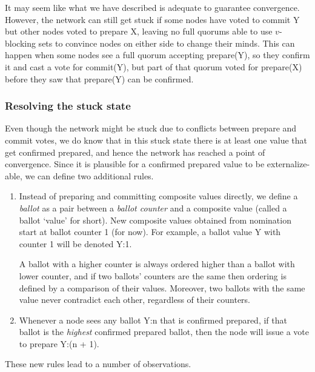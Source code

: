It may seem like what we have described is adequate to guarantee convergence. However, the network can still get stuck if some nodes have voted to commit Y but other nodes voted to prepare X, leaving no full quorums able to use $v$-blocking sets to convince nodes on either side to change their minds. This can happen when some nodes see a full quorum accepting prepare(Y), so they confirm it and cast a vote for commit(Y), but part of that quorum voted for prepare(X) before they saw that prepare(Y) can be confirmed.

\subsubsection{Resolving the stuck state}

Even though the network might be stuck due to conflicts between prepare and commit votes, we do know that in this stuck state there is at least one value that get confirmed prepared, and hence the network has reached a point of convergence. Since it is plausible for a confirmed prepared value to be externalize-able, we can define two additional rules.

\begin{enumerate}
    \item Instead of preparing and committing composite values directly, we define a {\em ballot} as a pair between a {\em ballot counter} and a composite value (called a ballot `value' for short). New composite values obtained from nomination start at ballot counter 1 (for now). For example, a ballot value Y with counter 1 will be denoted Y:1.

    A ballot with a higher counter is always ordered higher than a ballot with lower counter, and if two ballots' counters are the same then ordering is defined by a comparison of their values. Moreover, two ballots with the same value never contradict each other, regardless of their counters.

    \item Whenever a node sees any ballot Y:n that is confirmed prepared, if that ballot is the {\em highest} confirmed prepared ballot, then the node will issue a vote to prepare Y:(n + 1).
\end{enumerate}

These new rules lead to a number of observations.

